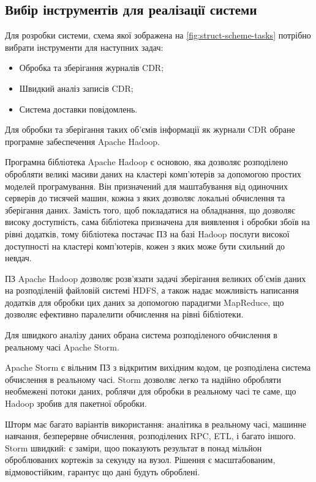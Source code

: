 \subsection{Вибір інструментів для реалізації системи}

Для розробки системи, схема якої зображена на \autoref{fig:struct-scheme-tasks} потрібно вибрати інструменти для наступних задач:

  \begin{itemize}
    \item Обробка та зберігання журналів CDR;
    \item Швидкий аналіз записів CDR;
    \item Система доставки повідомлень.
  \end{itemize}

Для обробки та зберігання таких об'ємів інформації як журнали CDR %
обране програмне забеспечення Apache Hadoop.

Програмна бібліотека Apache Hadoop є основою, яка дозволяє розподілено обробляти великі масиви даних на кластері комп'ютерів за допомогою простих моделей програмування. Він призначений для маштабування від одиночних серверів до тисячей машин, кожна з яких дозволяє локальні обчислення та зберігання даних. Замість того, щоб покладатися на обладнання, що дозволяє високу доступність, сама бібліотека призначена для виявлення і обробки збоїв на рівні додатків, тому бібліотека постачає ПЗ на базі Hadoop послуги високої доступності на кластері комп'ютерів, кожен з яких може бути схильний до невдач.

ПЗ Apache Hadoop дозволяє розв'язати задачі зберігання великих об'ємів даних на розподіленій файловій системі HDFS, а також надає можливість написання додатків для обробки цих даних за допомогою парадигми MapReduce, що дозволяє ефективно паралелити обчислення на рівні бібліотеки.

Для швидкого аналізу даних обрана система розподіленого обчислення в реальному часі Apache Storm.

Apache Storm є вільним ПЗ з відкритим вихідним кодом, це розподілена система обчислення в реальному часі. Storm дозволяє легко та надійно обробляти необмежені потоки даних, роблячи для обробки в реальному часі те саме, що Hadoop зробив для пакетної обробки.

Шторм має багато варіантів використання: аналітика в реальному часі, машинне навчання, безперервне обчислення, розподілених RPC, ETL, і багато іншого. Storm швидкий: є заміри, щоо показують результат в понад мільйон оброблюваних кортежів за секунду на вузол. Рішення є масштабованим, відмовостійким, гарантує що дані будуть оброблені.

